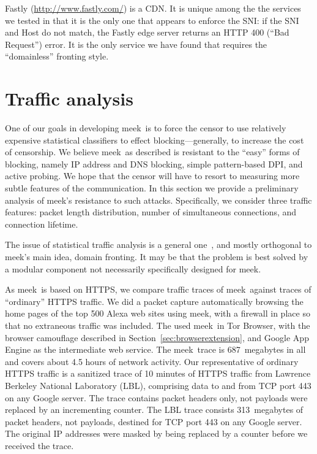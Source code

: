 \documentclass[conference]{IEEEtran}
\def\meek{meek}
\begin{document}
Fastly (\url{http://www.fastly.com/}) is a CDN.
It is unique among the the services we tested in that
it is the only one that appears to enforce the SNI:
if the SNI and Host do not match,
the Fastly edge server returns an HTTP 400 (``Bad Request'') error.
It is the only service we have found
that requires the ``domainless'' fronting style.

\section{Traffic analysis}
\label{sec:trafficanalysis}

One of our goals in developing \meek\ is to force
the censor to use relatively expensive statistical classifiers
to effect blocking---generally, to increase the cost of censorship.
We believe \meek\ as described is resistant to the ``easy''
forms of blocking, namely IP address and DNS blocking,
simple pattern-based DPI,
and active probing.
We hope that the censor will have to resort to measuring
more subtle features of the communication.
In this section we provide a preliminary analysis
of \meek's resistance to such attacks.
Specifically, we consider three traffic features:
packet length distribution,
number of simultaneous connections,
and connection lifetime.

The issue of statistical traffic analysis is a general one~\cite{trafficmorphing},
and mostly orthogonal to \meek's main idea, domain fronting.
It may be that the problem is
best solved by a modular component not
necessarily specifically designed for \meek.

As \meek\ is based on HTTPS,
we compare traffic traces of \meek\ against
traces of ``ordinary'' HTTPS traffic.
We did a packet capture
automatically browsing the home pages
of the top 500 Alexa web sites using \meek,
with a firewall in place so that no extraneous traffic was included.
The used \meek\ in Tor Browser,
with the browser camouflage described in Section~\ref{sec:browserextension},
and Google App Engine as the intermediate web service.
The \meek\ trace is 687~megabytes in all
and covers about 4.5 hours of network activity.
Our representative of ordinary HTTPS traffic
is a sanitized trace of 10 minutes of HTTPS traffic
from Lawrence Berkeley National Laboratory (LBL),
comprising data to and from TCP port 443 on any Google server.
The trace contains packet headers only, not payloads
were replaced by an incrementing counter.
The LBL trace consists 313~megabytes of packet headers,
not payloads, destined for TCP port 443 on any Google server.
The original IP addresses were masked by being
replaced by a counter before we received the trace.
\end{document}
